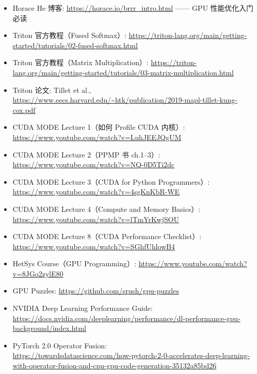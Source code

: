 \begin{itemize}
    \item Horace He 博客: \url{https://horace.io/brrr_intro.html} —— GPU 性能优化入门必读
    \item Triton 官方教程（Fused Softmax）: \url{https://triton-lang.org/main/getting-started/tutorials/02-fused-softmax.html}
    \item Triton 官方教程（Matrix Multiplication）: \url{https://triton-lang.org/main/getting-started/tutorials/03-matrix-multiplication.html}
    \item Triton 论文: Tillet et al., \url{https://www.eecs.harvard.edu/~htk/publication/2019-mapl-tillet-kung-cox.pdf}
    \item CUDA MODE Lecture 1（如何 Profile CUDA 内核）: \url{https://www.youtube.com/watch?v=LuhJEEJQgUM}
    \item CUDA MODE Lecture 2（PPMP 书 ch.1--3）: \url{https://www.youtube.com/watch?v=NQ-0D5Ti2dc}
    \item CUDA MODE Lecture 3（CUDA for Python Programmers）: \url{https://www.youtube.com/watch?v=4sgKnKbR-WE}
    \item CUDA MODE Lecture 4（Compute and Memory Basics）: \url{https://www.youtube.com/watch?v=lTmYrKwjSOU}
    \item CUDA MODE Lecture 8（CUDA Performance Checklist）: \url{https://www.youtube.com/watch?v=SGhfUhlowB4}
    \item HetSys Course（GPU Programming）: \url{https://www.youtube.com/watch?v=8JGo2zylE80}
    \item GPU Puzzles: \url{https://github.com/srush/gpu-puzzles}
    \item NVIDIA Deep Learning Performance Guide: \url{https://docs.nvidia.com/deeplearning/performance/dl-performance-gpu-background/index.html}
    \item PyTorch 2.0 Operator Fusion:\\ {\small\url{https://towardsdatascience.com/how-pytorch-2-0-accelerates-deep-learning-with-operator-fusion-and-cpu-gpu-code-generation-35132a85bd26}}
\end{itemize}


